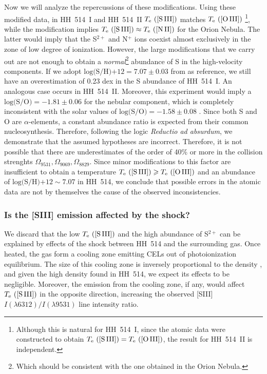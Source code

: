 \documentclass[fleqn,usenatbib]{mnras}
\begin{document}
Now we will analyze the repercussions of these modifications. Using these modified data, in HH~514~I and HH~514~II $T_{\rm e} \text{ ([S\thinspace III])}$ matches $T_{\rm e} \text{ ([O\thinspace III])}$ \footnote{Although this is natural for HH~514~I, since the atomic data were constructed to obtain $T_{\rm e} \text{ ([S\thinspace III])}= T_{\rm e} \text{ ([O\thinspace III])}$, the result for HH~514~II is independent.}, while the modification implies $T_{\rm e} \text{ ([S\thinspace III])}\approx T_{\rm e} \text{ ([N\thinspace II])}$ for the Orion Nebula. The latter would imply that the S$^{2+}$ and N$^{+}$ ions coexist almost exclusively in the zone of low degree of ionization. However, the large modifications that we carry out are not enough to obtain a \textit{normal}\footnote{Which should be consistent with the one obtained in the Orion Nebula.} abundance of S in the high-velocity components. If we adopt $\text{log(S/H)+12}=7.07 \pm 0.03$ from \citet{mendez2021-2} as reference, we still have an overestimation of 0.23 dex in the S abundance of HH~514~I. An analogous case occurs in HH~514~II. Moreover, this experiment would imply a $\text{log(S/O)}=-1.81 \pm 0.06$ for the nebular component, which is completely inconsistent with the solar values of $\text{log(S/O)}=-1.58 \pm 0.08$ \citep{lodders19}. Since both S and O are $\alpha$-elements, a constant abundance ratio is expected from their common nucleosynthesis. Therefore, following the logic \textit{Reductio ad absurdum}, we demonstrate that the assumed hypotheses are incorrect. Therefore, it is not possible that there are underestimates of the order of 40\% or more in the collision strenghts $\Omega_{9531}, \Omega_{9069}, \Omega_{8829}$. Since minor modifications to this factor are insufficient to obtain a temperature $T_{\rm e} \text{ ([S\thinspace III])} \geq T_{\rm e} \text{ ([O\thinspace III])}$ and an abundance of $\text{log(S/H)+12} \sim 7.07$ in HH~514, we conclude that possible errors in the atomic data are not by themselves the cause of the observed inconsistencies.

\subsubsection{Is the [S\thinspace III] emission affected by the shock?}
\label{subsec:shock_affected}

We discard that the low $T_{\rm e} \text{ ([S\thinspace III])}$ and the high abundance of S$^{2+}$ can be explained by effects of the shock between HH~514 and the surrounding gas. Once heated, the gas form a cooling zone emitting CELs out of photoionization equilibrium. The size of this cooling zone is inversely proportional to the density \citep[][]{Hartigan87}, and given the high density found in HH~514, we expect its effects to be negligible. Moreover, the emission from the cooling zone, if any, would affect $T_{\rm e} \text{ ([S\thinspace III])}$ in the opposite direction, increasing the observed [S\thinspace III] $I(\lambda 6312)/I(\lambda 9531)$ line intensity ratio. 
\end{document}
